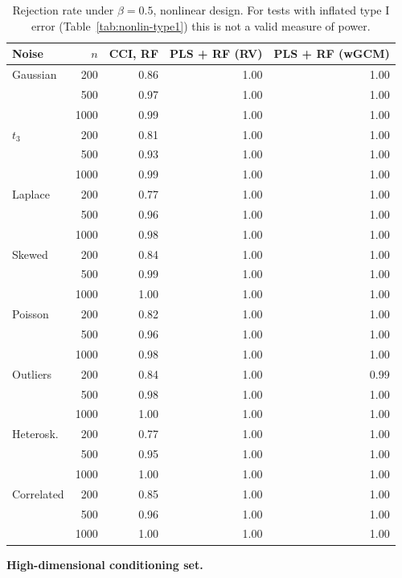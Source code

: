 \documentclass[10pt,leqno]{amsart}
\begin{document}
\begin{table}[H]
\caption{Rejection rate under $\beta=0.5$, nonlinear design. For tests with inflated type I error (Table~\ref{tab:nonlin-type1}) this is not a valid measure of power.}
\label{tab:nonlin-power}
\footnotesize
\begin{tabular}{lrrrr}
\toprule
Noise & $n$ & CCI, RF & PLS + RF (RV) & PLS + RF (wGCM) \\
\midrule
Gaussian & 200 & 0.86 & 1.00 & 1.00 \\
 & 500 & 0.97 & 1.00 & 1.00 \\
 & 1000 & 0.99 & 1.00 & 1.00 \\
\addlinespace[1pt]
$t_3$ & 200 & 0.81 & 1.00 & 1.00 \\
 & 500 & 0.93 & 1.00 & 1.00 \\
 & 1000 & 0.99 & 1.00 & 1.00 \\
\addlinespace[1pt]
Laplace & 200 & 0.77 & 1.00 & 1.00 \\
 & 500 & 0.96 & 1.00 & 1.00 \\
 & 1000 & 0.98 & 1.00 & 1.00 \\
\addlinespace[1pt]
Skewed & 200 & 0.84 & 1.00 & 1.00 \\
 & 500 & 0.99 & 1.00 & 1.00 \\
 & 1000 & 1.00 & 1.00 & 1.00 \\
\addlinespace[1pt]
Poisson & 200 & 0.82 & 1.00 & 1.00 \\
 & 500 & 0.96 & 1.00 & 1.00 \\
 & 1000 & 0.98 & 1.00 & 1.00 \\
\addlinespace[1pt]
Outliers & 200 & 0.84 & 1.00 & 0.99 \\
 & 500 & 0.98 & 1.00 & 1.00 \\
 & 1000 & 1.00 & 1.00 & 1.00 \\
\addlinespace[1pt]
Heterosk. & 200 & 0.77 & 1.00 & 1.00 \\
 & 500 & 0.95 & 1.00 & 1.00 \\
 & 1000 & 1.00 & 1.00 & 1.00 \\
\addlinespace[1pt]
Correlated & 200 & 0.85 & 1.00 & 1.00 \\
 & 500 & 0.96 & 1.00 & 1.00 \\
 & 1000 & 1.00 & 1.00 & 1.00 \\
\bottomrule
\end{tabular}
\end{table}

\par\medskip\noindent\textbf{High-dimensional conditioning set.}\par\nopagebreak
\end{document}
